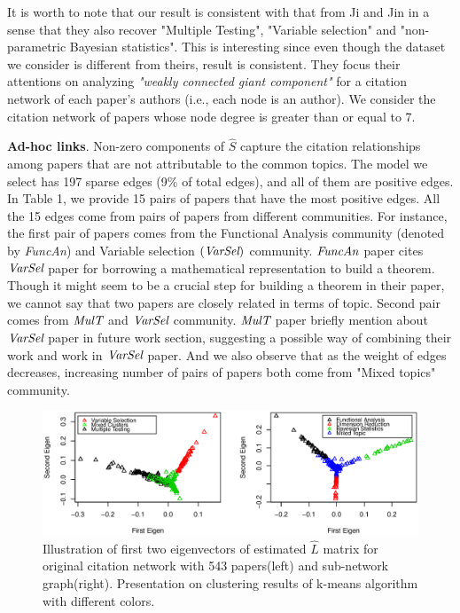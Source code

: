 \documentclass[AMS,STIX1COL]{WileyNJD-v2}
\begin{document}
It is worth to note that our result is consistent with that from Ji and Jin in a sense that they also recover "Multiple Testing", "Variable selection" and "non-parametric Bayesian statistics".
This is interesting since even though the dataset we consider is different from theirs, result is consistent.
They focus their attentions on analyzing \emph{"weakly connected giant component"} for a citation network of each paper's authors ({i.e., each node is an author}).
We consider the citation network of papers whose node degree is greater than or equal to 7.

\textbf{Ad-hoc links}. 
Non-zero components of $\widehat{S}$ capture the citation relationships among papers that are not attributable to the common topics.
The model we select has 197 sparse edges (9\% of total edges), and all of them are positive edges.
In Table 1, we provide 15 pairs of papers that have the most positive edges.
All the 15 edges come from pairs of papers from different communities.
For instance, the first pair of papers comes from the Functional Analysis community (denoted by \emph{FuncAn}) and Variable selection $(\emph{VarSel})$ community. 
$\emph{FuncAn}$ paper cites $\emph{VarSel}$ paper for borrowing a mathematical representation to build a theorem.
Though it might seem to be a crucial step for building a theorem in their paper, we cannot say that two papers are closely related in terms of topic.
Second pair comes from $\emph{MulT}$  and $\emph{VarSel}$ community.
$\emph{MulT}$ paper briefly mention about $\emph{VarSel}$ paper in future work section, suggesting a possible way of combining their work and work in $\emph{VarSel}$ paper.
And we also observe that as the weight of edges decreases, increasing number of pairs of papers both come from "Mixed topics" community. 

\begin{figure}[htbp]
\includegraphics[width=1\textwidth]{Fig3.eps}
\caption{Illustration of first two eigenvectors of estimated $\widehat{L}$ matrix for original
citation network with 543 papers(left) and sub-network graph(right). Presentation
on clustering results of k-means algorithm with different colors.}
\label{fig:figure3}
\end{figure}
\end{document}
